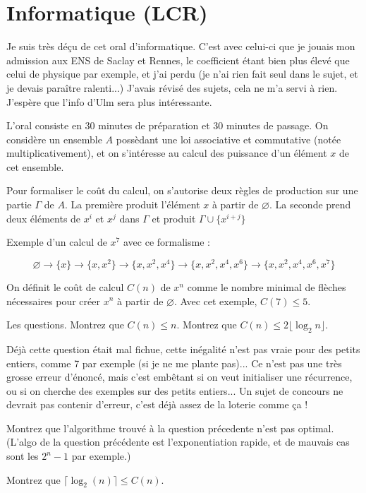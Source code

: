 \documentclass[french,a4paper, 12pt]{article}
\begin{document}
\section*{Informatique (LCR)}

Je suis très déçu de cet oral d'informatique. C'est avec celui-ci que je jouais mon admission aux ENS de Saclay et Rennes, le coefficient étant bien plus élevé que celui de physique par exemple, et j'ai perdu (je n'ai rien fait seul dans le sujet, et je devais paraître ralenti...) J'avais révisé des sujets, cela ne m'a servi à rien. J'espère que l'info d'Ulm sera plus intéressante.

L'oral consiste en 30 minutes de préparation et 30 minutes de passage. On considère un ensemble $A$ possèdant une loi associative et commutative (notée multiplicativement), et on s'intéresse au calcul des puissance d'un élément $x$ de cet ensemble.

Pour formaliser le coût du calcul, on s'autorise deux règles de production sur une partie $\Gamma$ de $A$. La première produit l'élément $x$ à partir de $\varnothing$. La seconde prend deux éléments de $x^i$ et $x^j$ dans $\Gamma$ et produit $\Gamma \cup \{x^{i+j}\}$

Exemple d'un calcul de $x^7$ avec ce formalisme :

$$\varnothing \longrightarrow \{x\}\longrightarrow \{x, x^2\} \longrightarrow \{x, x^2, x^4\}\longrightarrow \{x, x^2, x^4, x^6\}\longrightarrow \{x, x^2, x^4, x^6, x^7\}$$

On définit le coût de calcul $C(n)$ de $x^n$ comme le nombre minimal de flèches nécessaires pour créer $x^n$ à partir de $\varnothing$. Avec cet exemple, $C(7) \le 5$.

Les questions. Montrez que $C(n) \le n$. Montrez que $C(n) \le 2\lfloor \log_2{n}  \rfloor$.

Déjà cette question était mal fichue, cette inégalité n'est pas vraie pour des petits entiers, comme 7 par exemple (si je ne me plante pas)... Ce n'est pas une très grosse erreur d'énoncé, mais c'est embêtant si on veut initialiser une récurrence, ou si on cherche des exemples sur des petits entiers... Un sujet de concours ne devrait pas contenir d'erreur, c'est déjà assez de la loterie comme ça !

Montrez que l'algorithme trouvé à la question précedente n'est pas optimal. (L'algo de la question précédente est l'exponentiation rapide, et de mauvais cas sont les $2^n-1$ par exemple.)

Montrez que $\lceil \log_2(n)\rceil \le C(n)$.
\end{document}
